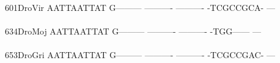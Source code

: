 \documentclass[11pt,twoside,reqno,a4paper]{article}
\begin{document}
{\hspace*{4\charwidth}\hspace*{7\charwidth}\hspace*{1\charwidth}\hspace*{1\charwidth}\hspace*{1\charwidth}\hspace*{1\charwidth}\hspace*{1\charwidth}\\
601\hspace*{1\charwidth}DroVir	AATTAATTAT	G---------	----------	----------	-TCGCCGCA-	---\\
\hspace*{4\charwidth}\hspace*{7\charwidth}\hspace*{1\charwidth}\hspace*{1\charwidth}\hspace*{1\charwidth}\hspace*{1\charwidth}\hspace*{1\charwidth}\\
634\hspace*{1\charwidth}DroMoj	AATTAATTAT	G---------	----------	----------	-TGG------	---\\
\hspace*{4\charwidth}\hspace*{7\charwidth}\hspace*{1\charwidth}\hspace*{1\charwidth}\hspace*{1\charwidth}\hspace*{1\charwidth}\hspace*{1\charwidth}\\
653\hspace*{1\charwidth}DroGri	AATTAATTAT	G---------	----------	----------	-TCGCCGAC-	---\\
\hspace*{4\charwidth}\hspace*{7\charwidth}\hspace*{1\charwidth}\hspace*{1\charwidth}\hspace*{1\charwidth}\hspace*{1\charwidth}\hspace*{1\charwidth}\\
\\
}
\end{document}
